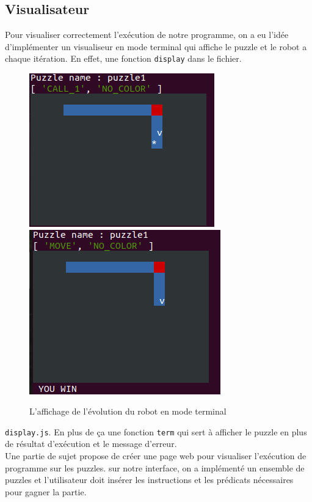 \documentclass[11pt]{article}
\begin{document}
\subsection{Visualisateur }
Pour visualiser correctement l'exécution de notre programme, on a eu l'idée d'implémenter un visualiseur en mode terminal qui affiche le puzzle et le robot a chaque itération. En effet, une fonction \texttt{display} dans le fichier.
\begin{figure}[h!]
\begin{center}
\includegraphics[scale=0.6]{puzzle2.png} \quad
\includegraphics[scale=0.6]{puzzle1.png}
\caption{L'affichage de l'évolution du robot en mode terminal}
\end{center}
\end{figure}

\texttt{display.js}. En plus de ça une fonction \texttt{term} qui sert à afficher le puzzle en plus de résultat d'exécution et le message d'erreur.\\
Une partie de sujet propose de créer une page web pour visualiser l'exécution de programme sur les puzzles. sur notre interface, on a implémenté un ensemble de puzzles et l'utilisateur doit
insérer les instructions et les prédicats nécessaires pour gagner la partie.
\end{document}
